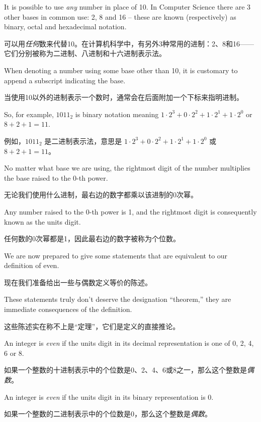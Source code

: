 It is possible to
use {\em any} number in place of 10.  In Computer Science there
are 3 other bases in common use: 2, 8 and 16 -- these are
known (respectively) as binary, octal and hexadecimal notation.

可以用{\em 任何}数来代替10。在计算机科学中，有另外3种常用的进制：2、8和16——它们分别被称为二进制、八进制和十六进制表示法。

When denoting a number using some base other than 10, it is
customary to append a subscript indicating the base.

当使用10以外的进制表示一个数时，通常会在后面附加一个下标来指明进制。

So, for example, $1011_2$ is binary notation meaning
$1\cdot2^3 + 0\cdot2^2 + 1\cdot2^1 + 1\cdot2^0$ or $8+2+1 = 11$.

例如，$1011_2$ 是二进制表示法，意思是 $1\cdot2^3 + 0\cdot2^2 + 1\cdot2^1 + 1\cdot2^0$ 或 $8+2+1 = 11$。

No matter what base we are using, the rightmost digit of
the number multiplies the base raised to the $0$-th power.

无论我们使用什么进制，最右边的数字都乘以该进制的0次幂。

Any number raised to the $0$-th power is 1, and the rightmost
digit is consequently known as the units digit.

任何数的0次幂都是1，因此最右边的数字被称为个位数。

We are now
prepared to give some statements that are equivalent to our
definition of even.

现在我们准备给出一些与偶数定义等价的陈述。

These statements truly don't deserve the
designation ``theorem,'' they are immediate consequences of the
definition.

这些陈述实在称不上是“定理”，它们是定义的直接推论。

\begin{thm}
An integer is {\em even} if the units digit in its decimal
representation is one of 0, 2, 4, 6 or 8.


如果一个整数的十进制表示中的个位数是0、2、4、6或8之一，那么这个整数是{\em 偶数}。
\end{thm}

\begin{thm}
An integer is {\em even} if the units digit in its binary
representation is 0.


如果一个整数的二进制表示中的个位数是0，那么这个整数是{\em 偶数}。
\end{thm}

